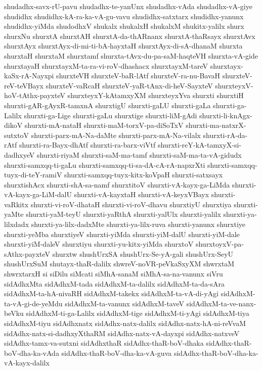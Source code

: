{shudadhx-savx-rU-pavu
shudadhx-te-yanUnx
shudadhx-vAda
shudadhx-vA-giye
shudidhx
shudidhx-kA-ra-ka-vA-gu-vavu
shudidhx-satxtarx
shudidhx-yanunx
shudidhx-yiMda
shudodhxV
shukalx
shukalxH
shukalxM
shukitx-yalilx
shurx
shurxNu
shurxtA
shurxtAH
shurxtA-da-thARnanx
shurxtA-thaRsayx
shurxtAvx
shurxtAyx
shurxtAyx-di-mi-ti-bA-hayxtaH
shurxtAyx-di-sA-dhanaM
shurxta
shurxtaH
shurxtaM
shurxtamf
shurxta-tAvx-du-pa-saM-haqteVH
shurxta-vA-gide
shurxtayaH
shurxtayxM-ta-ra-vi-roV-dhashacx
shurxtayxM-tareV
shurxtayx-kaSx-rA-Nayxpi
shurxteVH
shurxteV-baR-lAtf
shurxteV-ra-nu-BavaH
shurxteV-reV-teVBayx
shurxteV-vaRcaH
shurxteV-yaR-tAnx-di-heV-SayxteV
shurxteyxV-hoV-tAthx-payxteV
shurxteyxY-kAtamxyXM
shurxteyxYva
shurxti
shurxtiH
shurxti-gAR-gAyxR-tamxnA
shurxtigU
shurxti-gaLU
shurxti-gaLa
shurxti-ga-Lalilx
shurxti-ga-Lige
shurxti-gaLu
shurxtige
shurxti-liM-gAdi
shurxti-li-knAgx-dikoV
shurxti-mA-nataH
shurxti-maM-torxV-pa-diSoTxV
shurxti-ma-natxrX-sutxtoV
shurxti-parx-mA-Na-daMte
shurxti-parx-mA-Na-vilalx
shurxti-rA-da-rAtf
shurxti-ra-Bayx-dhAtf
shurxti-ra-barx-viVtf
shurxti-reY-kA-tamxyX-si-dadhxyeV
shurxti-riyaM
shurxti-saM-ma-tamf
shurxti-saM-ma-ta-vA-gidudx
shurxti-samxqq-ti-gaLu
shurxti-samxqq-ti-sa-dA-cA-rA-napxrXti
shurxti-samxqq-tuyx-di-teY-ramiV
shurxti-samxqq-tuyx-kitx-koVpaH
shurxti-satxsayx
shurxtishAcx
shurxti-shA-sa-namf
shurxtitoV
shurxti-vA-kayx-ga-LiMda
shurxti-vA-kayx-ga-LiM-dalU
shurxti-vA-kayxtaH
shurxti-vA-keyxVBayx
shurxti-vaRkitx
shurxti-vi-roV-dhataH
shurxti-vi-roV-dhavu
shurxtiyU
shurxtiya
shurxti-yaMte
shurxti-yaM-teyU
shurxti-yaRthA
shurxti-yalUlx
shurxti-yalilx
shurxti-ya-lilxdadx
shurxti-ya-lilx-dadxMte
shurxti-ya-lilx-ruva
shurxti-yanunx
shurxtiye
shurxti-yeMba
shurxtiyeV
shurxti-yiMda
shurxti-yiM-dalU
shurxti-yiM-dale
shurxti-yiM-daleV
shurxtiyu
shurxti-yu-kitx-yiMda
shurxtoV
shurxtoyxV-pa-sAthx-payxteV
shurxtw
shushUrxSA
shushUrx-Se-yA-gali
shushUrx-SeyU
shushUrxSuM
shutayx-thaR-dalilx
shwreV-noVR-peVkaSxyXM
shwrxtaM
shwrxtarxH
si
siDilu
siMcati
siMhA-sanaM
siMhA-sa-na-vanunx
siVru
sidAdhxMta
sidAdhxM-tada
sidAdhxM-ta-dalilx
sidAdhxM-ta-da-sAra
sidAdhxM-ta-hA-nivaRH
sidAdhxM-takekx
sidAdhxM-ta-vA-di-yAgi
sidAdhxM-ta-vA-gi-de-yeMdu
sidAdhxM-ta-vanunx
sidAdhxM-taveV
sidAdhxM-ta-ve-nanx-beVku
sidAdhxM-ti-ga-Lalilx
sidAdhxM-tige
sidAdhxM-ti-yAgi
sidAdhxM-tiya
sidAdhxM-tiyu
sidAdhxnatx
sidAdhx-natx-dalilx
sidAdhx-natx-hA-ni-reVvaM
sidAdhx-natx-si-dadhxyXthaRM
sidAdhx-natx-vA-dayxpi
sidAdhx-natxveV
sidAdhx-tamx-va-sutxni
sidAdhxthaR
sidAdhx-thaR-boV-dhaka
sidAdhx-thaR-boV-dha-ka-vAda
sidAdhx-thaR-boV-dha-ka-vA-guva
sidAdhx-thaR-boV-dha-ka-vA-kayx-dalilx
}
